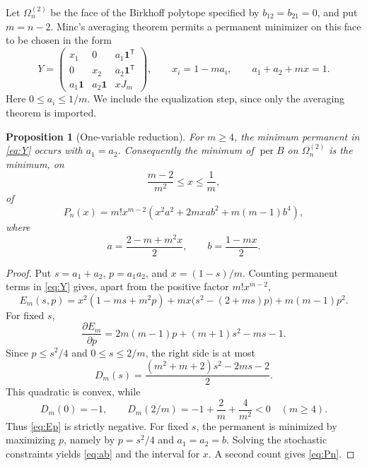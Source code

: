\documentclass[11pt]{article}
\newtheorem{proposition}[theorem]{Proposition}
\theoremstyle{remark}
\newcommand{\per}{\operatorname{per}}
\newcommand{\one}{\mathbf 1}
\begin{document}
Let $\Omega_n^{(2)}$ be the face of the Birkhoff polytope specified by
$b_{12}=b_{21}=0$, and put $m=n-2$.  Minc's averaging theorem permits a
permanent minimizer on this face to be chosen in the form
\begin{equation}\label{eq:Y}
 Y=
 \begin{pmatrix}
 x_1&0&a_1\one^{\mathsf T}\\
 0&x_2&a_2\one^{\mathsf T}\\
 a_1\one&a_2\one&xJ_m
 \end{pmatrix},
 \qquad
 x_i=1-ma_i,
 \qquad
 a_1+a_2+mx=1.
\end{equation}
Here $0\le a_i\le1/m$.  We include the equalization step, since only the
averaging theorem is imported.

\begin{proposition}[One-variable reduction]\label{prop:face-reduction}
For $m\ge4$, the minimum permanent in \eqref{eq:Y} occurs with $a_1=a_2$.
Consequently the minimum of $\per B$ on $\Omega_n^{(2)}$ is the minimum, on
\[
 \frac{m-2}{m^2}\le x\le\frac1m,
\]
of
\begin{equation}\label{eq:Pn}
 P_n(x)=m!x^{m-2}
 \left(x^2a^2+2mxab^2+m(m-1)b^4\right),
\end{equation}
where
\begin{equation}\label{eq:ab}
 a=\frac{2-m+m^2x}{2},\qquad b=\frac{1-mx}{2}.
\end{equation}
\end{proposition}
\begin{proof}
Put $s=a_1+a_2$, $p=a_1a_2$, and $x=(1-s)/m$.  Counting permanent terms in
\eqref{eq:Y} gives, apart from the positive factor $m!x^{m-2}$,
\begin{equation}\label{eq:Esp}
 E_m(s,p)=x^2(1-ms+m^2p)
 +mx\bigl(s^2-(2+ms)p\bigr)+m(m-1)p^2.
\end{equation}
For fixed $s$,
\begin{equation}\label{eq:Ep}
 \frac{\partial E_m}{\partial p}
 =2m(m-1)p+(m+1)s^2-ms-1.
\end{equation}
Since $p\le s^2/4$ and $0\le s\le2/m$, the right side is at most
\[
 D_m(s)=\frac{(m^2+m+2)s^2-2ms-2}{2}.
\]
This quadratic is convex, while
\[
 D_m(0)=-1,
 \qquad
 D_m(2/m)=-1+\frac2m+\frac4{m^2}<0
 \quad(m\ge4).
\]
Thus \eqref{eq:Ep} is strictly negative.  For fixed $s$, the permanent is
minimized by maximizing $p$, namely by $p=s^2/4$ and $a_1=a_2=b$.  Solving
the stochastic constraints yields \eqref{eq:ab} and the interval for $x$.
A second count gives \eqref{eq:Pn}.
\end{proof}
\end{document}

